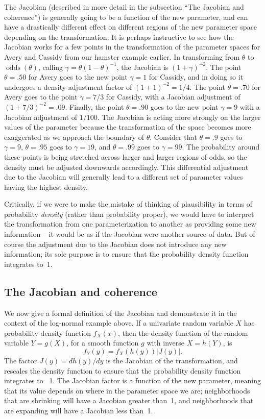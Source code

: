 \documentclass[9pt,twocolumn,twoside]{cidlab-draft}\templatetype{cidlab-invited}
\DeclareMathOperator*{\oddss}{odds}
\begin{document}
The Jacobian (described in more detail in the subsection ``The Jacobian and coherence'') is generally going to be a function of the new parameter, and can have a drastically different effect on different regions of the new parameter space depending on the transformation. It is perhaps instructive to see how the Jacobian works for a few points in the transformation of the parameter spaces for Avery and Cassidy from our hamster example earlier. In transforming from $\theta$ to $\oddss(\theta)$, calling $\gamma={\theta}(1-\theta)^{-1}$, the Jacobian is $(1+\gamma)^{-2}$. The point $\theta=.50$ for Avery goes to the new point $\gamma=1$ for Cassidy, and in doing so it undergoes a density adjustment factor of $(1+1)^{-2} = 1/4$. The point $\theta=.70$ for Avery goes to the point $\gamma=7/3$ for Cassidy, with a Jacobian adjustment of $(1+7/3)^{-2}=.09$. Finally, the point $\theta=.90$ goes to the new point $\gamma=9$ with a Jacobian adjustment of $1/100$.  The Jacobian is acting more strongly on the larger values of the parameter because the transformation of the space becomes more exaggerated as we approach the boundary of $\theta$. Consider that $\theta=.9$ goes to $\gamma=9$, $\theta=.95$ goes to $\gamma=19$, and $\theta=.99$ goes to $\gamma=99$. The probability around these points is being stretched across larger and larger regions of odds, so the density must be adjusted downwards accordingly. This differential adjustment due to the Jacobian will generally lead to a different set of parameter values having the highest density.

Critically, if we were to make the mistake of thinking of plausibility in terms of probability \textit{density} (rather than probability proper), we would have to interpret the transformation from one parameterization to another as providing some new information -- it would be as if the Jacobian were another source of data.  But of course the adjustment due to the Jacobian does not introduce any new information; its sole purpose is to ensure that the probability density function integrates to~1. 

\subsection{The Jacobian and coherence} \label{subsection:jacobian}
We now give a formal definition of the Jacobian and demonstrate it in the context of the log-normal example above. If a univariate random variable $X$ has probability density function $f_X(x)$, then the density function of the random variable $Y=g(X)$, for a smooth function $g$ with inverse $X = h(Y)$, is 
\begin{equation}\label{eq:jacobian}
f_Y(y) = f_X(h(y))  \left|J(y)\right|.
\end{equation}
The factor $J(y) = dh(y)/dy$ is the Jacobian of the transformation, and rescales the density function to ensure that the probability density function integrates to ~1. The Jacobian factor is a function of the new parameter, meaning that its value depends on where in the parameter space we are; neighborhoods that are shrinking will have a Jacobian greater than~1, and neighborhoods that are expanding will have a Jacobian less than~1.
\end{document}

